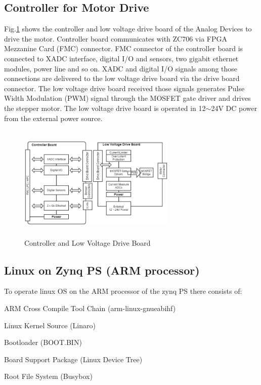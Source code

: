 \documentclass[a4paper,
              ]{jacow}
\begin{document}
\subsection{Controller for Motor Drive}
Fig.\ref{controller} shows the controller and low voltage drive board of the Analog Devices to drive the motor. Controller board communicates with ZC706 via FPGA Mezzanine Card (FMC) connector. FMC connector of the controller board is connected to XADC interface, digital I/O and sensors, two gigabit ethernet modules, power line and so on. XADC and digital I/O signals among those connections are delivered to the low voltage drive board via the drive board connector. The low voltage drive board received those signals generates Pulse Width Modulation (PWM) signal through the MOSFET gate driver and drives the stepper motor. The low voltage drive board is operated in 12${\sim}$24V DC power from the external power source.

\begin{figure}[!htb]
	\centering
	\includegraphics*[width=75mm, height=55mm]{controller}
	\caption{Controller and Low Voltage Drive Board}
	\label{controller}
\end{figure}

\subsection{Linux on Zynq PS (ARM processor)}
To operate linux OS on the ARM processor of the zynq PS there consists of:
\begin{Itemize}
	\item ARM Cross Compile Tool Chain (arm-linux-gnueabihf)
	\item Linux Kernel Source (Linaro)
	\item Bootloader (BOOT.BIN)
	\item Board Support Package (Linux Device Tree)
	\item Root File System (Busybox)
\end{Itemize}
\end{document}
